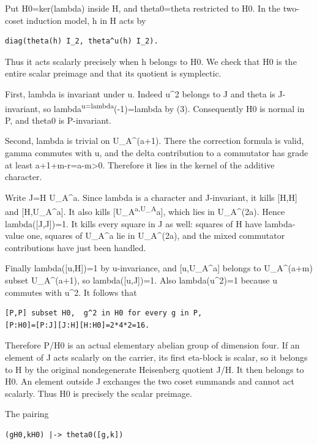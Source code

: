 Put H0=ker(lambda) inside H, and theta0=theta restricted to H0. In the
two-coset induction model, h in H acts by

\begin{Verbatim}[fontsize=\small,breaklines=true,breakanywhere=true]
diag(theta(h) I_2, theta^u(h) I_2).
\end{Verbatim}

Thus it acts scalarly precisely when h belongs to H0. We check that H0
is the entire scalar preimage and that its quotient is symplectic.

First, lambda is invariant under u. Indeed u\^{}2 belongs to J and theta
is J-invariant, so lambda\textsuperscript{u=lambda}(-1)=lambda by (3).
Consequently H0 is normal in P, and theta0 is P-invariant.

Second, lambda is trivial on U\_A\^{}(a+1). There the correction formula
is valid, gamma commutes with u, and the delta contribution to a
commutator has grade at least a+1+m-r=a-m\textgreater0. Therefore it
lies in the kernel of the additive character.

Write J=H U\_A\^{}a. Since lambda is a character and J-invariant, it
kills {[}H,H{]} and {[}H,U\_A\^{}a{]}. It also kills
{[}U\_A\textsuperscript{a,U\_A}a{]}, which lies in U\_A\^{}(2a). Hence
lambda({[}J,J{]})=1. It kills every square in J as well: squares of H
have lambda-value one, squares of U\_A\^{}a lie in U\_A\^{}(2a), and the
mixed commutator contributions have just been handled.

Finally lambda({[}u,H{]})=1 by u-invariance, and {[}u,U\_A\^{}a{]}
belongs to U\_A\^{}(a+m) subset U\_A\^{}(a+1), so lambda({[}u,J{]})=1.
Also lambda(u\^{}2)=1 because u commutes with u\^{}2. It follows that

\begin{Verbatim}[fontsize=\small,breaklines=true,breakanywhere=true]
[P,P] subset H0,  g^2 in H0 for every g in P,
[P:H0]=[P:J][J:H][H:H0]=2*4*2=16.
\end{Verbatim}

Therefore P/H0 is an actual elementary abelian group of dimension four.
If an element of J acts scalarly on the carrier, its first eta-block is
scalar, so it belongs to H by the original nondegenerate Heisenberg
quotient J/H. It then belongs to H0. An element outside J exchanges the
two coset summands and cannot act scalarly. Thus H0 is precisely the
scalar preimage.

The pairing

\begin{Verbatim}[fontsize=\small,breaklines=true,breakanywhere=true]
(gH0,kH0) |-> theta0([g,k])
\end{Verbatim}

